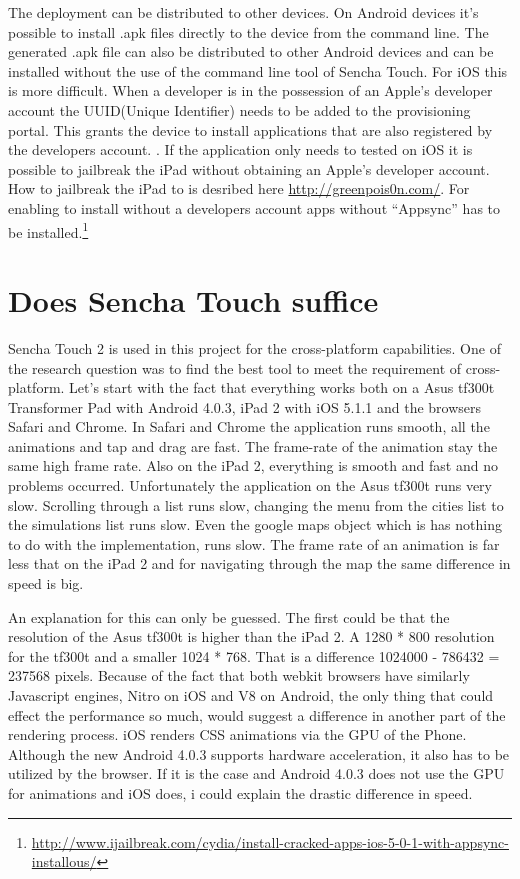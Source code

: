 The deployment can be distributed to other devices. On Android devices it's possible to install .apk files directly to the device from the command line. The generated .apk file can also be distributed to other Android devices and can be installed without the use of the command line tool of Sencha Touch.
For iOS this is more difficult. When a developer is in the possession of an Apple's developer account the UUID(Unique Identifier) needs to be added to the provisioning portal. This grants the device to install applications that are also registered by the developers account. . If the application only needs to tested on iOS it is possible to jailbreak the iPad without obtaining an Apple's developer account. How to jailbreak the iPad to is desribed here \url{http://greenpois0n.com/}. For enabling to install without a developers account apps without ``Appsync'' has to be installed.\footnote{\url{http://www.ijailbreak.com/cydia/install-cracked-apps-ios-5-0-1-with-appsync-installous/}}

\section{Does Sencha Touch suffice}
\label{sec:suffice}
Sencha Touch 2 is used in this project for the cross-platform capabilities. One of the research question was to find the best tool to meet the requirement of cross-platform. Let's start with the fact that everything works both on a Asus tf300t Transformer Pad with Android 4.0.3, iPad 2 with iOS 5.1.1 and the browsers Safari and Chrome. In Safari and Chrome the application runs smooth, all the animations and tap and drag are fast. The frame-rate of the animation stay the same high frame rate. Also on the iPad 2, everything is smooth and fast and no problems occurred. Unfortunately the application on the Asus tf300t runs very slow. Scrolling through a list runs slow, changing the menu from the cities list to the simulations list runs slow. Even the google maps object which is has nothing to do with the implementation, runs slow. The frame rate of an animation is far less that on the iPad 2 and for navigating through the map the same difference in speed is big. 

An explanation for this can only be guessed. The first could be that the resolution of the Asus tf300t is higher than the iPad 2. A 1280 * 800 resolution for the tf300t and a smaller 1024 * 768. That is a difference 1024000 - 786432 = 237568 pixels. 
Because of the fact that both webkit browsers have similarly Javascript engines, Nitro on iOS and V8 on Android, the only thing that could effect the performance so much, would suggest a difference in another part of the rendering process. iOS renders CSS animations via the GPU of the Phone. Although the new Android 4.0.3 supports hardware acceleration, it also has to be utilized by the browser. If it is the case and Android 4.0.3 does not use the GPU for animations and iOS does, i could explain the drastic difference in speed. 

